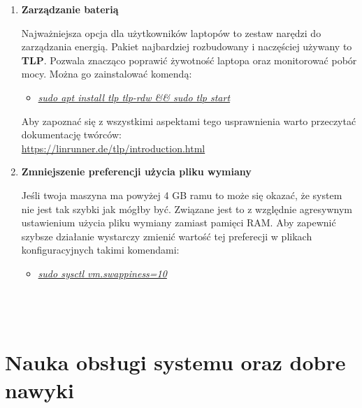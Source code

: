 \documentclass[10pt,a4paper]{report}
\begin{document}
\begin{enumerate}
\item \textbf{Zarządzanie baterią} \par Najważniejsza opcja dla użytkowników laptopów to zestaw narędzi do zarządzania energią. Pakiet najbardziej rozbudowany i naczęściej używany to \textbf{TLP}. Pozwala znacząco poprawić żywotność laptopa oraz monitorować pobór mocy. Można go zainstalować komendą:
\begin{itemize}
\item \textsl{\underline{sudo apt install tlp tlp-rdw \&\& sudo tlp start}}\par
\end{itemize}
Aby zapoznać się z wszystkimi aspektami tego usprawnienia warto przeczytać dokumentację twórców:\\\url{https://linrunner.de/tlp/introduction.html}\\

\item \textbf{Zmniejszenie preferencji użycia pliku wymiany}\par Jeśli twoja maszyna ma powyżej 4 GB ramu to może się okazać, że system nie jest tak szybki jak mógłby być. Związane jest to z względnie agresywnym ustawienium użycia pliku wymiany zamiast pamięci RAM. Aby zapewnić szybsze działanie wystarczy zmienić wartość tej preferecji w plikach konfiguracyjnych takimi komendami:
\begin{itemize}
\item \textsl{\underline{sudo sysctl vm.swappiness=10}}\\\\\\\\
\end{itemize}

\end{enumerate}

	\section{Nauka obsługi systemu oraz dobre nawyki}
	
\end{document}
